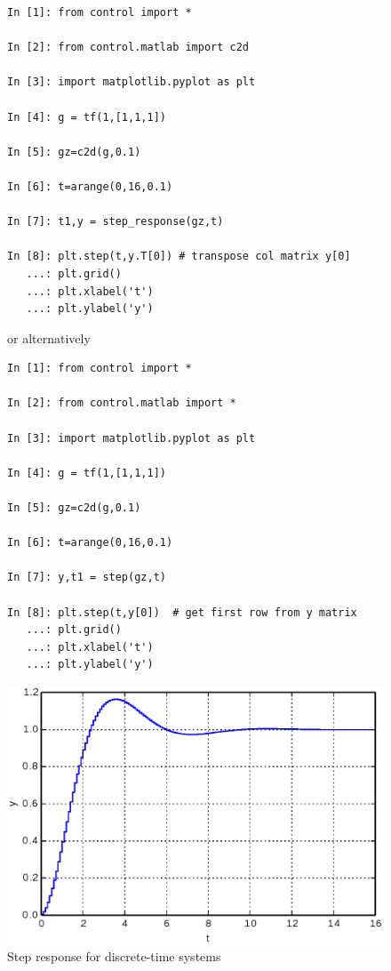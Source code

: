 \begin{figure}[htbp]	%
\begin{minipage}[t]{0.55\textwidth}
  \vspace{0pt}
\begin{lstlisting}[linewidth=7cm,xleftmargin=0cm]
In [1]: from control import *

In [2]: from control.matlab import c2d

In [3]: import matplotlib.pyplot as plt

In [4]: g = tf(1,[1,1,1])

In [5]: gz=c2d(g,0.1)

In [6]: t=arange(0,16,0.1)

In [7]: t1,y = step_response(gz,t)

In [8]: plt.step(t,y.T[0]) # transpose col matrix y[0]
   ...: plt.grid()
   ...: plt.xlabel('t')
   ...: plt.ylabel('y')
\end{lstlisting}

or alternatively

\begin{lstlisting}[linewidth=7cm,xleftmargin=0cm]
In [1]: from control import *

In [2]: from control.matlab import *

In [3]: import matplotlib.pyplot as plt

In [4]: g = tf(1,[1,1,1])

In [5]: gz=c2d(g,0.1)

In [6]: t=arange(0,16,0.1)

In [7]: y,t1 = step(gz,t)

In [8]: plt.step(t,y[0])  # get first row from y matrix
   ...: plt.grid()
   ...: plt.xlabel('t')
   ...: plt.ylabel('y')
\end{lstlisting}
\end{minipage}%
\begin{minipage}[t]{0.5\textwidth}
  \vspace{0pt} \centering
  \includegraphics[width=\textwidth]{eps/dstepresp.eps}
\end{minipage}
\caption{Step response for discrete-time systems}
\label{F2}
\end{figure}

